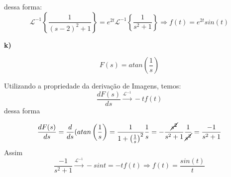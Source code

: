 dessa forma:
\begin{equation*}
    \mathcal{L}^{-1}\left\{\frac{1}{(s-2)^2 + 1}\right\} = e^{2t}\mathcal{L}^{-1}\left\{\frac{1}{s^2 +1 }\right\} \Rightarrow \boxed{f(t) = e^{2t}sin(t)}
\end{equation*}

\textbf{k)}

\begin{equation*}
    F(s) = atan\left(\frac{1}{s}\right)
\end{equation*}

Utilizando a propriedade da derivação de Imagens, temos:
\begin{equation*}
    \frac{dF(s)}{ds} \xrightarrow{\mathcal{L}^{-1}} -tf(t)    
\end{equation*}
dessa forma 

\begin{equation*}
    \frac{dF(s)}{ds} = \frac{d}{ds}(atan\left(\frac{1}{s}\right) = \frac{1}{1+\left(\frac{1}{s}\right)^2}\frac{1}{s} = -\frac{\cancel{s^2}}{s^2+1}\frac{1}{\cancel{s^2}} = \frac{-1}{s^2+1}
\end{equation*}
Assim
\begin{equation*}
    \frac{-1}{s^2+1} \xrightarrow{\mathcal{L}^{-1}} -sint = -tf(t) \Rightarrow \boxed{f(t) = \frac{sin(t)}{t}}
\end{equation*}

